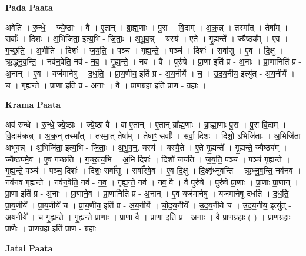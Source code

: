 \documentclass[17pt]{extarticle}
\begin{document}
\textbf{Pada Paata} \newline

अवेति॑ । रु॒न्धे॒ । ज्ये॒ष्ठाः । वै । ए॒तान् । ब्रा॒ह्म॒णाः । पु॒रा । वि॒दाम् । अ॒क्र॒न्न् । तस्मा᳚त् । तेषा᳚म् । सर्वाः᳚ । दिशः॑ । अ॒भिजि॑ता॒ इत्य॒भि - जि॒ताः॒ । अ॒भू॒व॒न्न् । यस्य॑ । ए॒ते । गृ॒ह्यन्ते᳚ । ज्यैष्ठ्य᳚म् । ए॒व । ग॒च्छ॒ति॒ । अ॒भीति॑ । दिशः॑ । ज॒य॒ति॒ । पञ्च॑ । गृ॒ह्य॒न्ते॒ । पञ्च॑ । दिशः॑ । सर्वा॑सु । ए॒व । दि॒क्षु । ऋ॒द्ध्नु॒व॒न्ति॒ । नव॑न॒वेति॒ नव॑ - न॒व॒ । गृ॒ह्य॒न्ते॒ । नव॑ । वै । पुरु॑षे । प्रा॒णा इति॑ प्र - अ॒नाः । प्रा॒णानिति॑ प्र - अ॒नान् । ए॒व । यज॑मानेषु । द॒ध॒ति॒ । प्रा॒य॒णीय॒ इति॑ प्र - अ॒य॒नीये᳚ । च॒ । उ॒द॒य॒नीय॒ इत्यु॑त् - अ॒य॒नीये᳚ । च॒ । गृ॒ह्य॒न्ते॒ । प्रा॒णा इति॑ प्र - अ॒नाः । वै । प्रा॒ण॒ग्र॒हा इति॑ प्राण - ग्र॒हाः ।  \newline


\textbf{Krama Paata} \newline

अव॑ रुन्धे । रु॒न्धे॒ ज्ये॒ष्ठाः । ज्ये॒ष्ठा वै । वा ए॒तान् । ए॒तान् ब्रा᳚ह्म॒णाः । ब्रा॒ह्मा॒णाः पु॒रा । पु॒रा वि॒दाम् । वि॒दाम॑क्रन्न् । अ॒क्र॒न् तस्मा᳚त् । तस्मा॒त् तेषा᳚म् । तेषाꣳ॒॒ सर्वाः᳚ । सर्वा॒ दिशः॑ । दिशो॒ ऽभिजि॑ताः । अ॒भिजि॑ता अभूवन्न् । अ॒भिजि॑ता॒ इत्य॒भि - जि॒ताः॒ । अ॒भू॒व॒न्॒. यस्य॑ । यस्यै॒ते । ए॒ते गृ॒ह्यन्ते᳚ । गृ॒ह्यन्ते॒ ज्यैष्ठ्य᳚म् । ज्यैष्ठ्य॑मे॒व । ए॒व ग॑च्छति । ग॒च्छ॒त्य॒भि । अ॒भि दिशः॑ । दिशो॑ जयति । ज॒य॒ति॒ पञ्च॑ । पञ्च॑ गृह्यन्ते । गृ॒ह्य॒न्ते॒ पञ्च॑ । पञ्च॒ दिशः॑ । दिशः॒ सर्वा॑सु । सर्वा᳚स्वे॒व । ए॒व दि॒क्षु । दि॒क्ष्वृ॑ध्नुवन्ति । ऋ॒ध्नु॒व॒न्ति॒ नव॑नव । नव॑नव गृह्यन्ते । नव॑न॒वेति॒ नव॑ - न॒व॒ । गृ॒ह्य॒न्ते॒ नव॑ । नव॒ वै । वै पुरु॑षे । पुरु॑षे प्रा॒णाः । प्रा॒णाः प्रा॒णान् । प्रा॒णा इति॑ प्र - अ॒नाः । प्रा॒णाने॒व । प्रा॒णानिति॑ प्र - अ॒नान् । ए॒व यज॑मानेषु । यज॑मानेषु दधति । द॒ध॒ति॒ प्रा॒य॒णीये᳚ । प्रा॒य॒णीये॑ च । प्रा॒य॒णीय॒ इति॑ प्र - अ॒य॒नीये᳚ । चो॒द॒य॒नीये᳚ । उ॒द॒य॒नीये॑ च । उ॒द॒य॒नीय॒ इत्यु॑त् - अ॒य॒नीये᳚ । च॒ गृ॒ह्य॒न्ते॒ । गृ॒ह्य॒न्ते॒ प्रा॒णाः । प्रा॒णा वै । प्रा॒णा इति॑ प्र - अ॒नाः । वै प्रा॑णग्र॒हाः ( ) । प्रा॒ण॒ग्र॒हाः प्रा॒णैः । प्रा॒ण॒ग्र॒हा इति॑ प्राण - ग्र॒हाः \newline

\textbf{Jatai Paata} \newline
\end{document}
